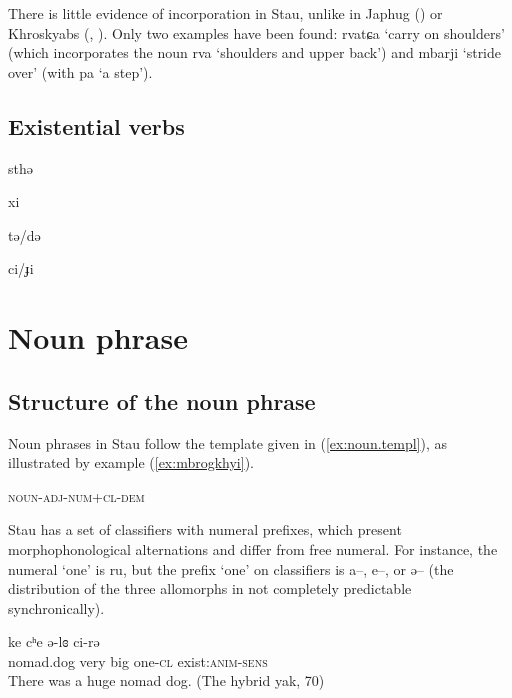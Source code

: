 \documentclass[oneside,a4paper,11pt]{article}
\newcommand{\ipa}[1]{{\phon #1}} %
\begin{document}
 
 There is little evidence of incorporation in Stau, unlike in Japhug (\citealt{jacques12incorp}) or Khroskyabs (\citealt{lai13affixale}, \citealt{lai14person}). Only two examples have been found: \ipa{rvatɕa} `carry on shoulders' (which incorporates the noun \ipa{rva} `shoulders and upper back') and \ipa{mbarji} `stride over' (with \ipa{pa}  `a step').

\subsection{Existential verbs}


\ipa{sthə}

\ipa{xi}


\ipa{tə/də}


 
\ipa{ci/ɟi}
 \section{Noun phrase}

\subsection{Structure of the noun phrase}
Noun phrases in Stau follow the template given in (\ref{ex:noun.templ}), as illustrated by example (\ref{ex:mbrogkhyi}). 

\begin{exe}
\ex \label{ex:noun.templ}
\glt \textsc{noun-adj-num+cl-dem}
\end{exe}

Stau has a set of classifiers with numeral prefixes, which present morphophonological alternations and differ from free numeral. For instance, the numeral `one' is \ipa{ru}, but the prefix `one' on classifiers is \ipa{a--}, \ipa{e--}, or \ipa{ə--} (the distribution of the three allomorphs in not completely predictable synchronically).

\begin{exe}
\ex \label{ex:mbrogkhyi}
\gll \ipa{mbroˠcʰə} \ipa{ke} \ipa{cʰe} \ipa{ə-lɞ} \ipa{ci-rə} \\
nomad.dog very big one-\textsc{cl} exist:\textsc{anim}-\textsc{sens}\\
\glt There was a huge nomad dog. (The hybrid yak, 70)
\end{exe}
\end{document}
